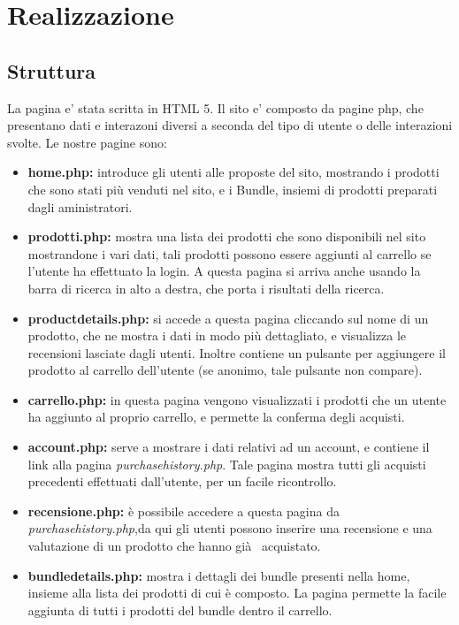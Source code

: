 \section{Realizzazione}
\subsection{Struttura}
La pagina e' stata scritta in HTML 5.\newline
Il sito e' composto da pagine php, che presentano dati e interazoni diversi a seconda del tipo di utente o delle interazioni svolte.
Le nostre pagine sono:
\begin{itemize}
 \item \textbf{home.php:} introduce gli utenti alle proposte del sito, mostrando i prodotti che sono stati più venduti nel sito, e i Bundle, insiemi di prodotti preparati dagli aministratori.
 
\item \textbf{prodotti.php:} mostra una lista dei prodotti che sono disponibili nel sito mostrandone i vari dati, tali prodotti possono essere aggiunti al carrello  se l'utente ha effettuato la login. A questa pagina si arriva anche usando la barra di ricerca in alto a destra, che porta i risultati della ricerca.

\item \textbf{productdetails.php:} si accede a questa pagina cliccando sul nome di un prodotto,  che ne mostra i dati in modo più dettagliato, e visualizza le recensioni lasciate dagli utenti. Inoltre contiene un pulsante per aggiungere il prodotto al carrello dell'utente (se anonimo, tale pulsante non compare).

\item \textbf{carrello.php:} in questa pagina vengono visualizzati i prodotti che un utente ha aggiunto al proprio carrello, e permette la conferma degli acquisti.

\item \textbf{account.php:} serve a mostrare i dati relativi ad un account, e contiene il link alla pagina \textit{purchasehistory.php}.
Tale pagina mostra tutti gli acquisti precedenti effettuati dall'utente, per un facile ricontrollo.

\item \textbf{recensione.php:} è possibile accedere a questa pagina da \textit{purchasehistory.php},da qui gli utenti possono inserire una recensione e una valutazione di un prodotto che hanno già  acquistato.

\item \textbf{bundledetails.php:} mostra i dettagli dei bundle presenti nella home, insieme alla lista dei prodotti di cui è composto. La pagina permette la facile aggiunta di tutti i prodotti del bundle dentro il carrello.


\end{itemize}
